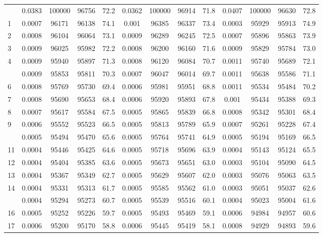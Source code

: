 \documentclass[
  14pt,
]{article}
\begin{document}
\begin{longtable}[t]{lcccccccccccc}
\endfoot
\bottomrule
\endlastfoot
0 & 0.0383 & 100000 & 96756 & 72.2 & 0.0362 & 100000 & 96914 & 71.8 & 0.0407 & 100000 & 96630 & 72.8\\
1 & 0.0007 & 96171 & 96138 & 74.1 & 0.001 & 96385 & 96337 & 73.4 & 0.0003 & 95929 & 95913 & 74.9\\
2 & 0.0008 & 96104 & 96064 & 73.1 & 0.0009 & 96289 & 96245 & 72.5 & 0.0007 & 95896 & 95863 & 73.9\\
3 & 0.0009 & 96025 & 95982 & 72.2 & 0.0008 & 96200 & 96160 & 71.6 & 0.0009 & 95829 & 95784 & 73.0\\
4 & 0.0009 & 95940 & 95897 & 71.3 & 0.0008 & 96120 & 96084 & 70.7 & 0.0011 & 95740 & 95689 & 72.1\\
\addlinespace
5 & 0.0009 & 95853 & 95811 & 70.3 & 0.0007 & 96047 & 96014 & 69.7 & 0.0011 & 95638 & 95586 & 71.1\\
6 & 0.0008 & 95769 & 95730 & 69.4 & 0.0006 & 95981 & 95951 & 68.8 & 0.0011 & 95534 & 95484 & 70.2\\
7 & 0.0008 & 95690 & 95653 & 68.4 & 0.0006 & 95920 & 95893 & 67.8 & 0.001 & 95434 & 95388 & 69.3\\
8 & 0.0007 & 95617 & 95584 & 67.5 & 0.0005 & 95865 & 95839 & 66.8 & 0.0008 & 95342 & 95301 & 68.4\\
9 & 0.0006 & 95552 & 95523 & 66.5 & 0.0005 & 95813 & 95789 & 65.9 & 0.0007 & 95261 & 95228 & 67.4\\
\addlinespace
10 & 0.0005 & 95494 & 95470 & 65.6 & 0.0005 & 95764 & 95741 & 64.9 & 0.0005 & 95194 & 95169 & 66.5\\
11 & 0.0004 & 95446 & 95425 & 64.6 & 0.0005 & 95718 & 95696 & 63.9 & 0.0004 & 95143 & 95124 & 65.5\\
12 & 0.0004 & 95404 & 95385 & 63.6 & 0.0005 & 95673 & 95651 & 63.0 & 0.0003 & 95104 & 95090 & 64.5\\
13 & 0.0004 & 95367 & 95349 & 62.7 & 0.0005 & 95629 & 95607 & 62.0 & 0.0003 & 95076 & 95063 & 63.5\\
14 & 0.0004 & 95331 & 95313 & 61.7 & 0.0005 & 95585 & 95562 & 61.0 & 0.0003 & 95051 & 95037 & 62.6\\
\addlinespace
15 & 0.0004 & 95294 & 95273 & 60.7 & 0.0005 & 95539 & 95516 & 60.1 & 0.0004 & 95023 & 95004 & 61.6\\
16 & 0.0005 & 95252 & 95226 & 59.7 & 0.0005 & 95493 & 95469 & 59.1 & 0.0006 & 94984 & 94957 & 60.6\\
17 & 0.0006 & 95200 & 95170 & 58.8 & 0.0006 & 95445 & 95419 & 58.1 & 0.0008 & 94929 & 94893 & 59.6\\

\end{longtable}
\end{document}
